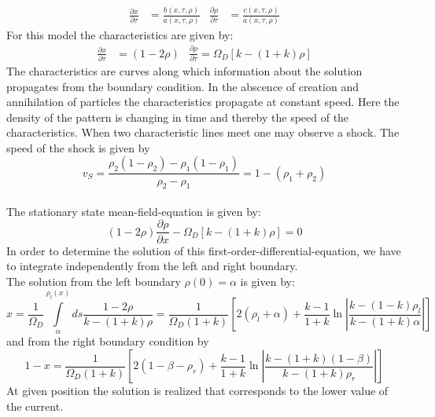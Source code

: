 \begin{align*}
	\frac{\partial x}{\partial\tau}&=\frac{b(x,\tau,\rho)}{a(x,\tau,\rho)} & \frac{\partial\rho}{\partial\tau}&=\frac{c(x,\tau,\rho)}{a(x,\tau,\rho)}
\end{align*}
For this model the characteristics are given by:
\begin{align*}
	\frac{\partial x}{\partial\tau}&=\left(1-2\rho\right) & \frac{\partial\rho}{\partial\tau}=\Omega_D\left[k-\left(1+k\right)\rho\right]
\end{align*}
The characteristics are curves along which information about the solution propagates from the boundary condition. In the abscence of creation and annihilation of particles the characteristics propagate at constant speed. Here the density of the pattern is changing in time and thereby the speed of the characteristics. When two characteristic lines meet one may observe a shock. The speed of the shock is given by
\begin{equation*}
	v_S=\frac{\rho_2(1-\rho_2)-\rho_1(1-\rho_1)}{\rho_2-\rho_1}=1-\left(\rho_1+\rho_2\right)
\end{equation*}
\textbf{\underline{}}\vspace{3mm}\\
The stationary state mean-field-equation is given by:
\begin{equation*}
	\left(1-2\rho\right)\frac{\partial\rho}{\partial x}-\Omega_D\left[k-\left(1+k\right)\rho\right]=0
\end{equation*}
In order to determine the solution of this first-order-differential-equation, we have to integrate independently from the left and right boundary.\\
The solution from the left boundary $\rho(0)=\alpha$ is given by:
\begin{equation*}
	x=\frac{1}{\Omega_D}\int\limits_\alpha^{\rho_l(x)}ds\frac{1-2\rho}{k-\left(1+k\right)\rho}=\frac{1}{\Omega_D\left(1+k\right)}\left[2\left(\rho_l+\alpha\right)+\frac{k-1}{1+k}\ln\left|\frac{k-\left(1-k\right)\rho_l}{k-\left(1+k\right)\alpha}\right|\right]
\end{equation*}
and from the right boundary condition by
\begin{equation*}
	1-x=\frac{1}{\Omega_D\left(1+k\right)}\left[2\left(1-\beta-\rho_r\right)+\frac{k-1}{1+k}\ln\left|\frac{k-\left(1+k\right)\left(1-\beta\right)}{k-\left(1+k\right)\rho_r}\right|\right]
\end{equation*}
At given position the solution is realized that corresponds to the lower value of the current.\\
